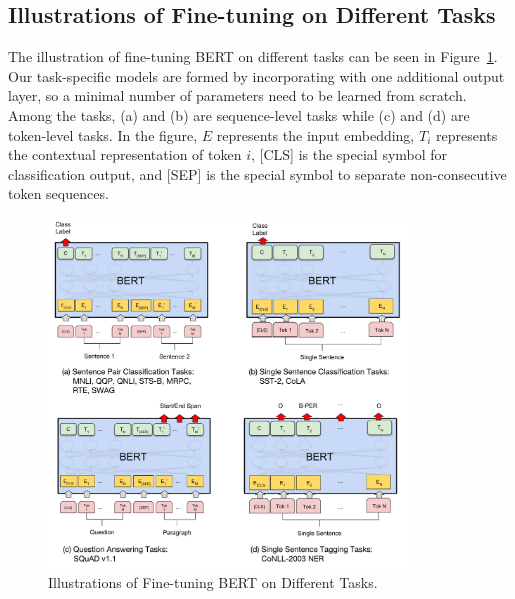 \subsection{Illustrations of Fine-tuning on Different Tasks}
\label{appendix:sec:fine_tune_details_and_figures}

The illustration of fine-tuning BERT on different tasks can be seen in
Figure~\ref{fig:bert_fine_tune}. Our task-specific models are formed by incorporating \bert with one additional output layer, so a  minimal number of parameters need to be learned from scratch. Among the tasks, (a) and (b) are sequence-level tasks while (c) and (d) are token-level tasks. In the figure, $E$ represents the input embedding, $T_i$ represents the contextual representation of token $i$, \textsc{[CLS]} is the special symbol for classification output, and \textsc{[SEP]} is the special symbol to separate non-consecutive token sequences.
\begin{figure}[ht]
\begin{center}
\includegraphics[width=0.85\textwidth]{BERT_fine_tune.pdf}
\end{center}
\caption{Illustrations of Fine-tuning BERT on Different Tasks.}
\label{fig:bert_fine_tune}
\end{figure}




